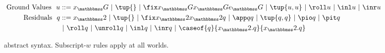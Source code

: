\begin{figure}[t]
\begin{abstrsyn}
\[\begin{aligned}
\text{Ground Values}\ \ 
u &::= \varG
 \gbar\tup{}
 \gbar \fix \varG \varG \exprG
 \gbar \tup{u, u} 
 \gbar \roll u
 \gbar \inl u 
 \gbar \inr u \\
\text{Residuals}\ \ 
q &::= \varT
 \gbar \tup{}
 \gbar \fix \varT \varT q
 \gbar \app q q 
 \gbar \tup{q, q} 
 \gbar \pio q 
 \gbar \pit q \\
&\gbar \roll q
 \gbar \unroll q
 \gbar \inl q 
 \gbar \inr q
 \gbar \caseof {q}{\varT.q}{\varT.q} \\
\end{aligned}\]
\end{abstrsyn}
\caption{\lang\ abstract syntax. Subscript-$w$ rules apply at all worlds.}
\label{fig:grammar}
\end{figure}
